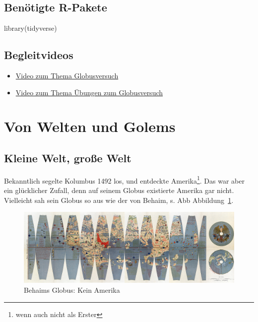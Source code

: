 \documentclass[
  a4paper,
  DIV=11]{scrreprt}
\newenvironment{Shaded}{\begin{snugshade}}{\end{snugshade}}
\newcommand{\FunctionTok}[1]{\textcolor[rgb]{0.28,0.35,0.67}{#1}}
\newcommand{\NormalTok}[1]{\textcolor[rgb]{0.00,0.23,0.31}{#1}}
\providecommand{\tightlist}{%
  \setlength{\itemsep}{0pt}\setlength{\parskip}{0pt}}\usepackage{longtable,booktabs,array}
\theoremstyle{definition}
\theoremstyle{remark}
\begin{document}
\hypertarget{benuxf6tigte-r-pakete-1}{%
\subsection{Benötigte R-Pakete}\label{benuxf6tigte-r-pakete-1}}

\begin{Shaded}
\begin{Highlighting}[]
\FunctionTok{library}\NormalTok{(tidyverse)}
\end{Highlighting}
\end{Shaded}

\hypertarget{begleitvideos-3}{%
\subsection{Begleitvideos}\label{begleitvideos-3}}

\begin{itemize}
\tightlist
\item
  \href{https://youtu.be/fGlt9Ld4xzk}{Video zum Thema Globusversuch}
\item
  \href{https://youtu.be/YJEZiQvCBgs}{Video zum Thema Übungen zum
  Globusversuch}
\end{itemize}

\hypertarget{von-welten-und-golems}{%
\section{Von Welten und Golems}\label{von-welten-und-golems}}

\hypertarget{kleine-welt-grouxdfe-welt}{%
\subsection{Kleine Welt, große Welt}\label{kleine-welt-grouxdfe-welt}}

Bekanntlich segelte Kolumbus 1492 los, und entdeckte Amerika\footnote{wenn
  auch nicht als Erster}. Das war aber ein glücklicher Zufall, denn auf
seinem Globus existierte Amerika gar nicht. Vielleicht sah sein Globus
so aus wie der von Behaim, s. Abb Abbildung~\ref{fig-behaim}.

\begin{figure}

{\centering \includegraphics{./img/Behaim.jpg}

}

\caption{\label{fig-behaim}Behaims Globus: Kein Amerika}

\end{figure}
\end{document}
